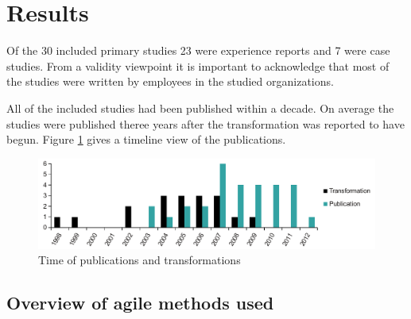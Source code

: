 \documentclass[lnbip]{svmultln}
\begin{document}
%
%


\section{Results}
\label{sec:results}

Of the 30 included primary studies 23 were experience reports and 7 were case
studies. From a validity viewpoint it is important to acknowledge that most of
the studies were written by employees in the studied organizations.

All of the included studies had been published within a decade. On average the
studies were published theree years after the transformation was reported to
have begun. Figure \ref{fig:publications} gives a timeline view of the
publications.

\begin{figure}[htb]
  \begin{center}
    \includegraphics[width=1\textwidth]{publicationschart.pdf}
    \caption{Time of publications and transformations}
    \label{fig:publications}
  \end{center}
\end{figure}


\subsection{Overview of agile methods used}
\end{document}
